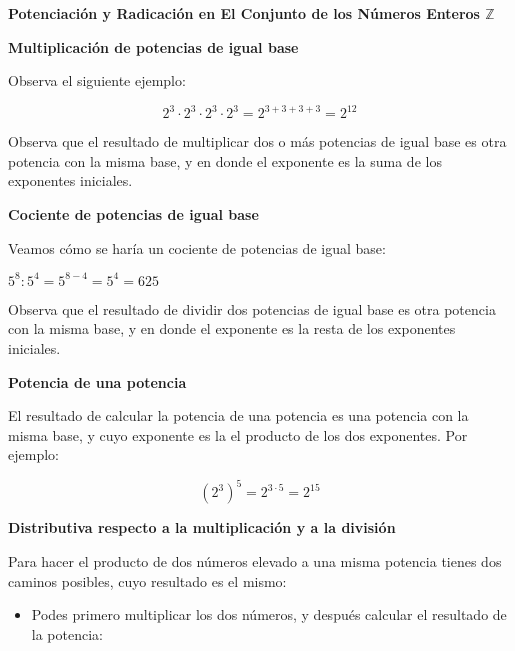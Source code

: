 \documentclass[12pt]{examdesign}
\theoremstyle{plain}
\theoremstyle{definition}
\theoremstyle{remark}
\begin{document}
	\begin{endmatter}
		\vspace{.2cm}
		\centerline{\large \textcolor{upforestgreen}{\textbf{Potenciación y Radicación en El Conjunto de los Números Enteros ${\mathbb Z}$}}}
		\vspace{.2cm}
		
	    \textbf{Multiplicación de potencias de igual base} 
	   
	   Observa el siguiente ejemplo:
	   
	   $$2^{3}\cdot 2^{3} \cdot 2^{3} \cdot 2^{3} = 2^{3+3+3+3} = 2^{12}$$
	   
	   Observa que el resultado de multiplicar dos o más potencias de igual base es otra potencia con la misma base, y en donde el exponente es la suma de los exponentes iniciales.
	   
	   \vspace{.2cm}
	   
	   \textbf{Cociente de potencias de igual base}
	   
	   Veamos cómo se haría un cociente de potencias de igual base:
	   
	   $5^{8} : 5^{4} = 5^{8-4} = 5^{4} = 625$
	   
	   Observa que el resultado de dividir dos potencias de igual base es otra potencia con la misma base, y en donde el exponente es la resta de los exponentes iniciales.
	   
	   \vspace{.2cm}
	   
	   \textbf{Potencia de una potencia}
	   
	   El resultado de calcular la potencia de una potencia es una potencia con la misma base, y cuyo exponente es la el producto de los dos exponentes. Por ejemplo:
	   
	   $$(2^{3})^{5} = 2^{3\cdot 5} = 2^{15}$$
	   
	   \vspace{.2cm}
	   
	   \textbf{Distributiva respecto a la multiplicación y a la división}
	   
	    Para hacer el producto de dos números elevado a una misma potencia tienes dos caminos posibles, cuyo resultado es el mismo:
	   
	    \begin{itemize}
	    	\item Podes primero multiplicar los dos números, y después calcular el resultado de la potencia:
	    	

\end{itemize}
\end{endmatter}
\end{document}
